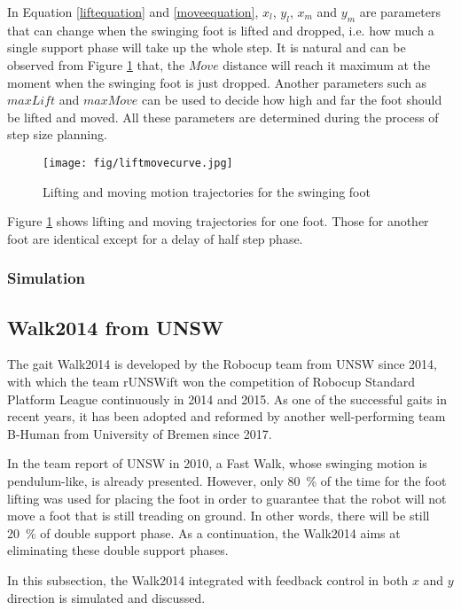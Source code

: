 In Equation {\ref{liftequation}} and {\ref{moveequation}}, $ x_l $, $ y_l $, $ x_m $ and $ y_m $ are parameters that can change when the swinging foot is lifted and dropped, i.e. how much a single support phase will take up the whole step. It is natural and can be observed from Figure {\ref{liftmovecurve}} that, the $ \mathit{Move} $ distance will reach it maximum at the moment when the swinging foot is just dropped. Another parameters such as $ \mathit{maxLift} $ and $ \mathit{maxMove} $ can be used to decide how high and far the foot should be lifted and moved. All these parameters are determined during the process of step size planning.

\begin{figure}[H]
	\centering
	\texttt{[image: fig/liftmovecurve.jpg]}
	\caption{Lifting and moving motion trajectories for the swinging foot}
	\label{liftmovecurve}
\end{figure}

Figure {\ref{liftmovecurve}} shows lifting and moving trajectories for one foot. Those for another foot are identical except for a delay of half step phase.

\subsubsection{Simulation}

\subsection{Walk2014 from UNSW}
\label{walk2014gait}
The gait Walk2014 is developed by the Robocup team from UNSW since 2014, with which the team rUNSWift won the competition of Robocup Standard Platform League continuously in 2014 and 2015. As one of the successful gaits in recent years, it has been adopted and reformed by another well-performing team B-Human from University of Bremen since 2017\cite{BHumanCodeRelease2017}.

In the team report of UNSW\cite{ratter2010runswift} in 2010, a Fast Walk, whose swinging motion is pendulum-like, is already presented. However, only \SI{80}{\percent} of the time for the foot lifting was used for placing the foot in order to guarantee that the robot will not move a foot that is still treading on ground. In other words, there will be  still \SI{20}{\percent} of double support phase. As a continuation, the Walk2014 aims at eliminating these double support phases.

In this subsection, the Walk2014 integrated with feedback control in both $ x $ and $ y $ direction is simulated and discussed. 

